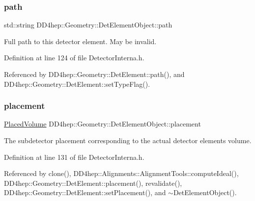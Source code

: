 \subsubsection{\texorpdfstring{path}{path}}
{\footnotesize\ttfamily std\+::string D\+D4hep\+::\+Geometry\+::\+Det\+Element\+Object\+::path}



Full path to this detector element. May be invalid. 



Definition at line 124 of file Detector\+Interna.\+h.



Referenced by D\+D4hep\+::\+Geometry\+::\+Det\+Element\+::path(), and D\+D4hep\+::\+Geometry\+::\+Det\+Element\+::set\+Type\+Flag().

\hypertarget{class_d_d4hep_1_1_geometry_1_1_det_element_object_a7ee03e0b36f123f1ae48fda184303c2a}{}\label{class_d_d4hep_1_1_geometry_1_1_det_element_object_a7ee03e0b36f123f1ae48fda184303c2a} 
\subsubsection{\texorpdfstring{placement}{placement}}
{\footnotesize\ttfamily \hyperlink{class_d_d4hep_1_1_geometry_1_1_placed_volume}{Placed\+Volume} D\+D4hep\+::\+Geometry\+::\+Det\+Element\+Object\+::placement}



The subdetector placement corresponding to the actual detector element\textquotesingle{}s volume. 



Definition at line 131 of file Detector\+Interna.\+h.



Referenced by clone(), D\+D4hep\+::\+Alignments\+::\+Alignment\+Tools\+::compute\+Ideal(), D\+D4hep\+::\+Geometry\+::\+Det\+Element\+::placement(), revalidate(), D\+D4hep\+::\+Geometry\+::\+Det\+Element\+::set\+Placement(), and $\sim$\+Det\+Element\+Object().

\hypertarget{class_d_d4hep_1_1_geometry_1_1_det_element_object_a64bf695379c82abca8e8054307a94861}{}\label{class_d_d4hep_1_1_geometry_1_1_det_element_object_a64bf695379c82abca8e8054307a94861} 
